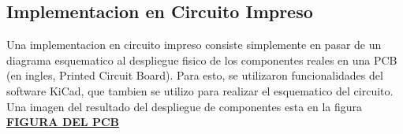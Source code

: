
\subsection{Implementacion en Circuito Impreso} %
\label{sub:implementacion_en_circuito_impreso}

Una implementacion en circuito impreso consiste simplemente en pasar de un diagrama esquematico al despliegue fisico de los componentes reales en una PCB (en ingles, Printed Circuit Board). Para esto, se utilizaron funcionalidades del software KiCad, que tambien se utilizo para realizar el esquematico del circuito. Una imagen del resultado del despliegue de componentes esta en la figura \textbf{\underline{FIGURA DEL PCB}}





